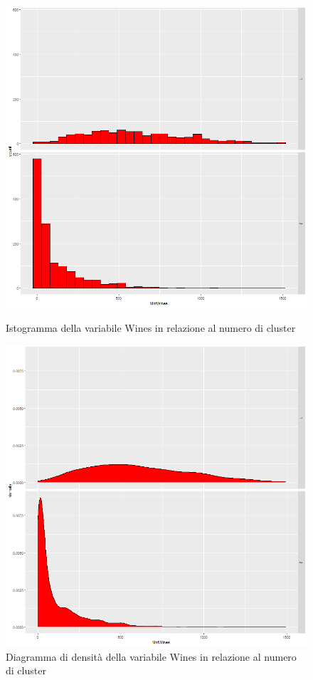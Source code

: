 \documentclass[letterpaper,11pt]{article}
\begin{document}
\begin{figure}[H]
   \begin{minipage}{0.48\textwidth}
     \centering
         \includegraphics[width=1\textwidth]{Img/K-MEANS/KMEANS007.png}
    \caption{Istogramma della variabile Wines in relazione al numero di cluster}
    \label{fig:winesKmeansHistogram}
   \end{minipage}\hfill
   \begin{minipage}{0.48\textwidth}
     \centering
     \includegraphics[width=1\linewidth]{Img/K-MEANS/KMEANS008.png}
     \caption{Diagramma di densità della variabile Wines in relazione al numero di cluster}\label{fig:winesKmeansDensity}
   \end{minipage}
\end{figure}
\end{document}
